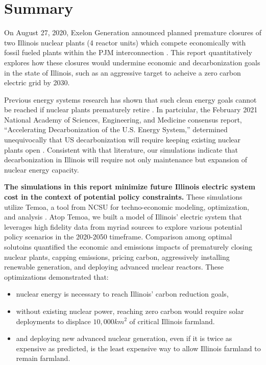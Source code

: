 \section{Summary}
On August 27, 2020, Exelon Generation announced planned premature closures of 
two Illinois nuclear plants (4 reactor units) which compete economically with 
fossil fueled plants within the \gls{PJM} interconnection \cite{larson_exelon_2020}. 
This report quantitatively explores how these closures would undermine economic 
and decarbonization goals in the state of Illinois, such as an aggressive 
target to acheive a zero carbon electric grid by 2030.

Previous energy systems research has shown that such clean energy goals cannot 
be reached if nuclear plants prematurely retire 
\cite{national_academies_of_sciences_engineering_and_medicine_2021_accelerating_2021,larson_net-zero_2020,davis_net-zero_2018}.  
In partciular, the February 2021 National Academy of Sciences, Engineering, and 
Medicine consensus report, ``Accelerating Decarbonization of the U.S. Energy 
System,'' determined unequivocally that US decarbonization will require keeping 
existing nuclear plants open 
\cite{national_academies_of_sciences_engineering_and_medicine_2021_accelerating_2021}. 
Consistent with that literature, our simulations indicate that decarbonization 
in Illinois will require not only maintenance but expansion of nuclear energy capacity. 

\textbf{The simulations in this report minimize future Illinois electric system 
cost in the context of potential policy constraints.} These simulations 
utilize Temoa, a tool from \gls{NCSU} for techno-economic modeling, 
optimization, and analysis \cite{decarolis_temoa_2010,decarolis_modelling_2016,decarolis_formalizing_2017}. 
Atop Temoa, we built a model of Illinois' electric system that leverages high 
fidelity data from myriad sources to explore various potential policy scenarios 
in the 2020-2050 timeframe. Comparison among optimal solutoins quantified the 
economic and emissions impacts of prematurely closing nuclear plants, capping 
emissions, pricing carbon, aggressively installing renewable generation, and 
deploying advanced nuclear reactors.  These optimizations demonstrated that:


\begin{itemize}
        \item nuclear energy is necessary to reach Illinois' carbon reduction 
                goals,
        \item without existing nuclear power, reaching zero carbon would 
                require solar deployments to displace $10,000km^2$ of critical 
                Illinois 
                farmland.
        \item and deploying new advanced nuclear generation, even if it is 
                twice as expensive as predicted, is the least expensive way to 
                allow Illinois farmland to remain farmland.
  \end{itemize}

